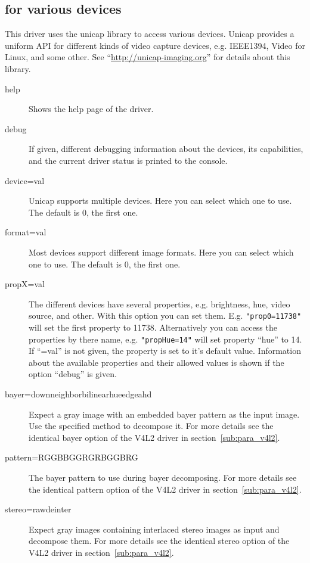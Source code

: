 \subsection { for various devices}

This driver uses the unicap library to access various
devices. Unicap provides a uniform API for different kinds of video
capture devices, e.g. IEEE1394, Video for Linux, and some other.
See 
``\url{http://unicap-imaging.org}'' for details about this
library.
\begin{description}
\item[help] Shows the help page of the driver.
\item[debug] If given, different debugging information about the
  devices, its capabilities, and the current driver status is
  printed to the console.
\item[device=val] Unicap supports multiple devices. Here you can
  select which one to use. The default is 0, the first one.
\item[format=val] Most devices support different image formats. Here
  you can select which one to use. The default is 0, the first one.
\item[propX=val] The different devices have several properties,
  e.g. brightness, hue, video source, and other. With this option
  you can set them. E.g. \verb|"prop0=11738"| will set the first
  property to 11738. Alternatively you can access the properties by
  there name, e.g. \verb|"propHue=14"| will set property ``hue'' to
  14. If ``=val'' is not given, the property is set to it's default
  value. Information about the available properties and their
  allowed values is shown if the option ``debug'' is given.
\item[bayer=down\textbar{}neighbor\textbar{}bilinear\textbar{}hue\textbar{}edge\textbar{}ahd]
  Expect a gray image with an embedded bayer pattern as the input
  image. Use the specified method to decompose it. For more details
  see the identical bayer option of the V4L2 driver in
  section~\ref{sub:para_v4l2}.
\item[pattern=RGGB\textbar{}BGGR\textbar{}GRBG\textbar{}GBRG]
  The bayer pattern to use during bayer decomposing. For more
  details see the identical pattern option of the V4L2 driver in
  section~\ref{sub:para_v4l2}.
\item[stereo=raw\textbar{}deinter] Expect gray images containing
  interlaced stereo images as input and decompose them. For more
  details see the identical stereo option of the V4L2 driver in
  section~\ref{sub:para_v4l2}.
\end{description}

